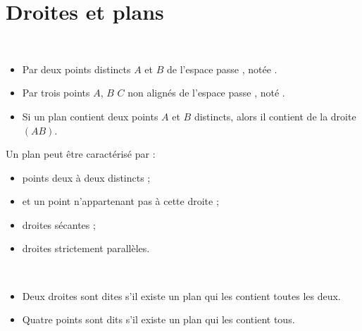 \documentclass[10pt]{article}
\begin{document}
\section{Droites et plans}

\begin{propriete}~
  \begin{itemize}
    \item Par deux points distincts $A$ et $B$ de l'espace passe , notée .
    \item Par trois points $A$, $B$ $C$ non alignés de l'espace passe , noté .
    \item Si un plan contient deux points $A$ et $B$ distincts, alors il contient  de la droite $(AB)$.
  \end{itemize}
\end{propriete}

\begin{propriete}
  Un plan peut être caractérisé par :
  \begin{itemize}
    \item {} points deux à deux distincts ;
    \item {} et un point n'appartenant pas à cette droite ;
    \item {} droites sécantes ;
    \item {} droites strictement parallèles.
  \end{itemize}
\end{propriete}

\begin{definition}~
  \begin{itemize}
    \item Deux droites sont dites  s'il existe un plan qui les contient toutes les deux.
    \item Quatre points sont dits  s'il existe un plan qui les contient tous.
  \end{itemize}
\end{definition}
\end{document}
